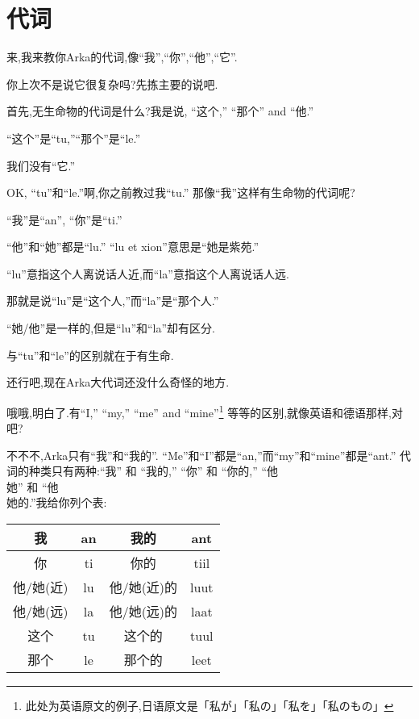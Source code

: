 \chapter[代词]{代词}

来,我来教你Arka的代词,像``我'',``你'',``他'',``它''.


你上次不是说它很复杂吗?先拣主要的说吧.

首先,无生命物的代词是什么?我是说, ``这个,'' ``那个'' and ``他.''


``这个''是``tu,''``那个''是``le.''

我们没有``它.''


OK, ``tu''和``le.''啊,你之前教过我``tu.''
那像``我''这样有生命物的代词呢?


``我''是``an'', ``你''是``ti.''

``他''和``她''都是``lu.'' ``lu et xion''意思是``她是紫苑.''

``lu''意指这个人离说话人近,而``la''意指这个人离说话人远.


那就是说``lu''是``这个人,''而``la''是``那个人.''

``她/他''是一样的,但是``lu''和``la''却有区分.

与``tu''和``le''的区别就在于有生命.

还行吧,现在Arka大代词还没什么奇怪的地方.

哦哦,明白了.有``I,'' ``my,'' ``me'' and ``mine''\footnote{此处为英语原文的例子,日语原文是「私が」「私の」「私を」「私のもの」}
等等的区别,就像英语和德语那样,对吧?


不不不,Arka只有``我''和``我的''.
``Me''和``I''都是``an,''而``my''和``mine''都是``ant.''
代词的种类只有两种:``我'' 和 ``我的,'' ``你'' 和 ``你的,'' ``他\\她'' 和 ``他\\她的.''我给你列个表:
\begin{table}[H]
    \begin{tabular}{|c|c|c|c|} %
    \hline
	我&  an&  我的&  ant\\\hline
	你&  ti&  你的&  tiil\\\hline
  	他/她(近)&  lu&  他/她(近)的&  luut\\\hline
	他/她(远)&  la&  他/她(远)的&  laat\\\hline
	这个&  tu&  这个的&  tuul\\\hline
	那个&  le&  那个的&  leet\\\hline
	\end{tabular}
\end{table}

